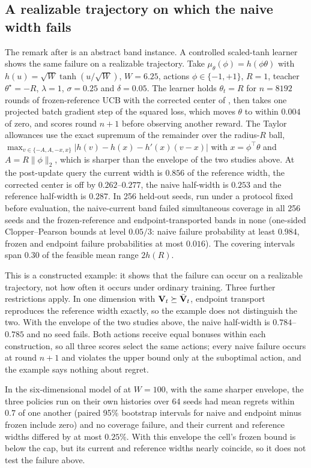 \subsection{A realizable trajectory on which the naive width fails}
\label{sec:transport-realizable}

The remark after  is an abstract band
instance. A controlled scaled-tanh learner shows the same failure on a realizable
trajectory. Take $\mu_\theta(\phi)=h(\phi\theta)$ with
$h(u)=\sqrt W\tanh(u/\sqrt W)$, $W=6.25$, actions $\phi\in\{-1,+1\}$, $R=1$,
teacher $\theta^\star=-R$, $\lambda=1$, $\sigma=0.25$ and $\delta=0.05$. The
learner holds $\theta_t=R$ for $n=8192$ rounds of frozen-reference UCB with the
corrected center of , then takes one projected
batch gradient step of the squared loss, which moves $\theta$ to within $0.004$
of zero, and scores round $n+1$ before observing another reward. The Taylor
allowances use the exact supremum of the remainder over the radius-$R$ ball,
$\max_{v\in\{-A,A,-x,x\}}|h(v)-h(x)-h'(x)(v-x)|$ with $x=\phi^\top\theta$ and
$A=R\|\phi\|_2$, which is sharper than the envelope of the two studies above.
At the post-update query the current width is $0.856$ of the reference width,
the corrected center is off by $0.262$--$0.277$, the naive half-width is
$0.253$ and the reference half-width is $0.287$. In 256 held-out seeds, run
under a protocol fixed before evaluation, the naive-current band failed
simultaneous coverage in all 256 seeds and the frozen-reference and
endpoint-transported bands in none (one-sided Clopper--Pearson bounds at level
$0.05/3$: naive failure probability at least $0.984$, frozen and endpoint
failure probabilities at most $0.016$). The covering intervals span $0.30$ of
the feasible mean range $2h(R)$.

This is a constructed example: it shows that the failure can occur on a
realizable trajectory, not how often it occurs under ordinary training. Three
further restrictions apply. In one dimension with $\mathbf{V}_t\succeq\bar{\mathbf{V}}_t$,
endpoint transport reproduces the reference width exactly, so the example does
not distinguish the two. With the envelope of the two studies above, the naive
half-width is $0.784$--$0.785$ and no seed fails. Both actions receive equal
bonuses within each construction, so all three scores select the same actions;
every naive failure occurs at round $n+1$ and violates the upper bound only at
the suboptimal action, and the example says nothing about regret.

In the six-dimensional model of  at $W=100$, with the
same sharper envelope, the three policies run on their own histories over 64
seeds had mean regrets within $0.7$ of one another (paired 95\% bootstrap
intervals for naive and endpoint minus frozen include zero) and no coverage
failure, and their current and reference widths differed by at most $0.25\%$.
With this envelope the cell's frozen bound is below the cap, but its current
and reference widths nearly coincide, so it does not test the failure above.
